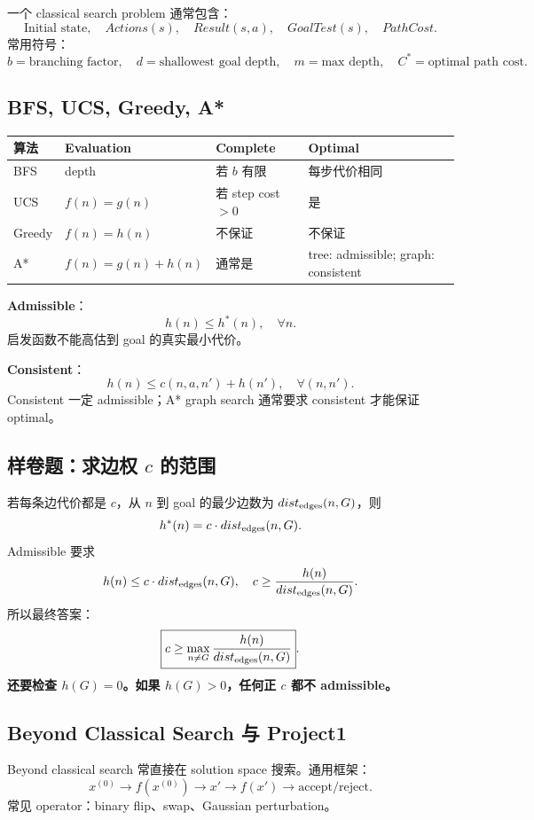 \documentclass[UTF8,11pt,a4paper]{ctexart}
\newcommand{\key}[1]{\textbf{\color{blue!55!black}#1}}
\newcommand{\warn}[1]{\textbf{\color{red!60!black}#1}}
\begin{document}
一个 classical search problem 通常包含：
\[
\text{Initial state},\quad Actions(s),\quad Result(s,a),\quad GoalTest(s),\quad PathCost.
\]
常用符号：
\[
b=\text{branching factor},\quad d=\text{shallowest goal depth},\quad
m=\text{max depth},\quad C^*=\text{optimal path cost}.
\]

\subsection{BFS, UCS, Greedy, A*}

\begin{center}
\begin{tabular}{llll}
\toprule
算法 & Evaluation & Complete & Optimal \\
\midrule
BFS & depth & 若 $b$ 有限 & 每步代价相同 \\
UCS & $f(n)=g(n)$ & 若 step cost $>0$ & 是 \\
Greedy & $f(n)=h(n)$ & 不保证 & 不保证 \\
A* & $f(n)=g(n)+h(n)$ & 通常是 & tree: admissible; graph: consistent \\
\bottomrule
\end{tabular}
\end{center}

\key{Admissible}：
\[
h(n)\le h^*(n),\quad \forall n.
\]
启发函数不能高估到 goal 的真实最小代价。

\key{Consistent}：
\[
h(n)\le c(n,a,n')+h(n'),\quad \forall(n,n').
\]
Consistent 一定 admissible；A* graph search 通常要求 consistent 才能保证 optimal。

\subsection{样卷题：求边权 $c$ 的范围}

若每条边代价都是 $c$，从 $n$ 到 goal 的最少边数为 $dist_{\rm edges}(n,G)$，则
\[
h^*(n)=c\cdot dist_{\rm edges}(n,G).
\]
Admissible 要求
\[
h(n)\le c\cdot dist_{\rm edges}(n,G),\quad
c\ge \frac{h(n)}{dist_{\rm edges}(n,G)}.
\]
所以最终答案：
\[
\boxed{c\ge \max_{n\ne G}\frac{h(n)}{dist_{\rm edges}(n,G)}}.
\]
\warn{还要检查 $h(G)=0$。如果 $h(G)>0$，任何正 $c$ 都不 admissible。}

\subsection{Beyond Classical Search 与 Project1}

Beyond classical search 常直接在 solution space 搜索。通用框架：
\[
x^{(0)}\to f(x^{(0)})\to x'\to f(x')\to \text{accept/reject}.
\]
常见 operator：binary flip、swap、Gaussian perturbation。
\end{document}
